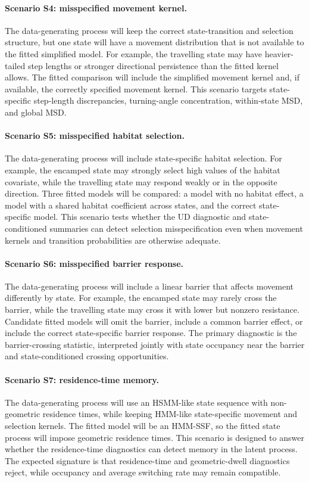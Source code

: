\documentclass[11pt]{article}
\begin{document}
\paragraph{Scenario S4: misspecified movement kernel.}
The data-generating process will keep the correct state-transition and
selection structure, but one state will have a movement distribution that is
not available to the fitted simplified model. For example, the travelling
state may have heavier-tailed step lengths or stronger directional persistence
than the fitted kernel allows. The fitted comparison will include the
simplified movement kernel and, if available, the correctly specified movement
kernel. This scenario targets state-specific step-length discrepancies,
turning-angle concentration, within-state MSD, and global MSD.

\paragraph{Scenario S5: misspecified habitat selection.}
The data-generating process will include state-specific habitat selection. For
example, the encamped state may strongly select high values of the habitat
covariate, while the travelling state may respond weakly or in the opposite
direction. Three fitted models will be compared: a model with no habitat
effect, a model with a shared habitat coefficient across states, and the
correct state-specific model. This scenario tests whether the UD diagnostic
and state-conditioned summaries can detect selection misspecification even
when movement kernels and transition probabilities are otherwise adequate.

\paragraph{Scenario S6: misspecified barrier response.}
The data-generating process will include a linear barrier that affects
movement differently by state. For example, the encamped state may rarely
cross the barrier, while the travelling state may cross it with lower but
nonzero resistance. Candidate fitted models will omit the barrier, include a
common barrier effect, or include the correct state-specific barrier response.
The primary diagnostic is the barrier-crossing statistic, interpreted jointly
with state occupancy near the barrier and state-conditioned crossing
opportunities.

\paragraph{Scenario S7: residence-time memory.}
The data-generating process will use an HSMM-like state sequence with
non-geometric residence times, while keeping HMM-like state-specific movement
and selection kernels. The fitted model will be an HMM-SSF, so the fitted
state process will impose geometric residence times. This scenario is designed
to answer whether the residence-time diagnostics can detect memory in the
latent process. The expected signature is that residence-time and
geometric-dwell diagnostics reject, while occupancy and average switching rate
may remain compatible.
\end{document}
